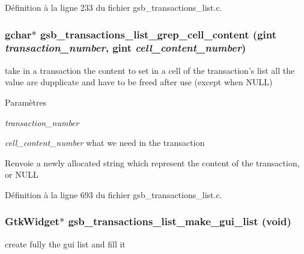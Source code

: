 Définition à la ligne 233 du fichier gsb\_\-transactions\_\-list.c.

\subsubsection[{gsb\_\-transactions\_\-list\_\-grep\_\-cell\_\-content}]{\setlength{\rightskip}{0pt plus 5cm}gchar$\ast$ gsb\_\-transactions\_\-list\_\-grep\_\-cell\_\-content (gint {\em transaction\_\-number}, \/  gint {\em cell\_\-content\_\-number})}\label{gsb__transactions__list_8c_a1e229d05133af4abe35b72675491f580}
take in a transaction the content to set in a cell of the transaction's list all the value are dupplicate and have to be freed after use (except when NULL)


\begin{DoxyParams}{Paramètres}
\item[{\em transaction\_\-number}]\item[{\em cell\_\-content\_\-number}]what we need in the transaction\end{DoxyParams}
\begin{DoxyReturn}{Renvoie}
a newly allocated string which represent the content of the transaction, or NULL 
\end{DoxyReturn}


Définition à la ligne 693 du fichier gsb\_\-transactions\_\-list.c.

\subsubsection[{gsb\_\-transactions\_\-list\_\-make\_\-gui\_\-list}]{\setlength{\rightskip}{0pt plus 5cm}GtkWidget$\ast$ gsb\_\-transactions\_\-list\_\-make\_\-gui\_\-list (void)}\label{gsb__transactions__list_8c_a5a3574009546c888666713aa8269327b}
create fully the gui list and fill it


